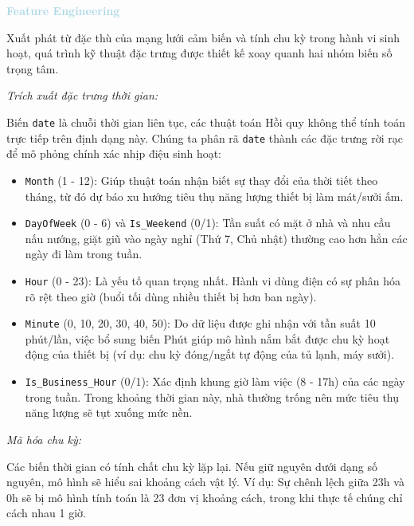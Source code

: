 \vspace{0.5em}
\noindent\textcolor{lightblue}{\textbf{Feature Engineering}}
\vspace{0.5em}

Xuất phát từ đặc thù của mạng lưới cảm biến và tính chu kỳ trong hành vi sinh hoạt, quá trình kỹ thuật đặc trưng được thiết kế xoay quanh hai nhóm biến số trọng tâm.

\textit{Trích xuất đặc trưng thời gian:}

Biến \texttt{date} là chuỗi thời gian liên tục, các thuật toán Hồi quy không thể tính toán trực tiếp trên định dạng này. Chúng ta phân rã \texttt{date} thành các đặc trưng rời rạc để mô phỏng chính xác nhịp điệu sinh hoạt:

\begin{itemize}
    \item \texttt{Month} (1 - 12): Giúp thuật toán nhận biết sự thay đổi của thời tiết theo tháng, từ đó dự báo xu hướng tiêu thụ năng lượng thiết bị làm mát/sưởi ấm.
    
    \item \texttt{DayOfWeek} (0 - 6) và \texttt{Is\_Weekend} (0/1): Tần suất có mặt ở nhà và nhu cầu nấu nướng, giặt giũ vào ngày nghỉ (Thứ 7, Chủ nhật) thường cao hơn hẳn các ngày đi làm trong tuần.
    
    \item \texttt{Hour} (0 - 23): Là yếu tố quan trọng nhất. Hành vi dùng điện có sự phân hóa rõ rệt theo giờ (buổi tối dùng nhiều thiết bị hơn ban ngày).
    
    \item \texttt{Minute} (0, 10, 20, 30, 40, 50): Do dữ liệu được ghi nhận với tần suất 10 phút/lần, việc bổ sung biến Phút giúp mô hình nắm bắt được chu kỳ hoạt động của thiết bị (ví dụ: chu kỳ đóng/ngắt tự động của tủ lạnh, máy sưởi).
    
    \item \texttt{Is\_Business\_Hour} (0/1): Xác định khung giờ làm việc (8 - 17h) của các ngày trong tuần. Trong khoảng thời gian này, nhà thường trống nên mức tiêu thụ năng lượng sẽ tụt xuống mức nền.
\end{itemize}

\textit{Mã hóa chu kỳ:}

Các biến thời gian có tính chất chu kỳ lặp lại. Nếu giữ nguyên dưới dạng số nguyên, mô hình sẽ hiểu sai khoảng cách vật lý. Ví dụ: Sự chênh lệch giữa 23h và 0h sẽ bị mô hình tính toán là 23 đơn vị khoảng cách, trong khi thực tế chúng chỉ cách nhau 1 giờ.

